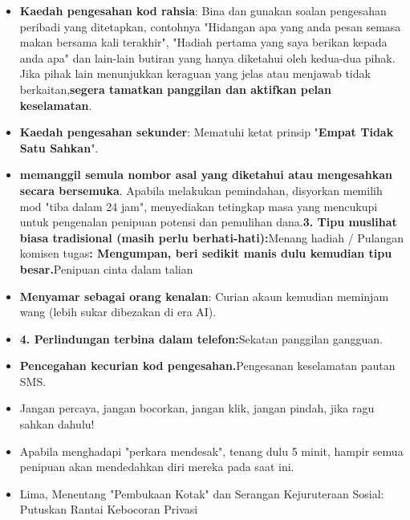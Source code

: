 \begin{itemize}
  \item \textbf{Kaedah pengesahan kod rahsia}: Bina dan gunakan soalan pengesahan peribadi yang ditetapkan, contohnya "Hidangan apa yang anda pesan semasa makan bersama kali terakhir", "Hadiah pertama yang saya berikan kepada anda apa" dan lain-lain butiran yang hanya diketahui oleh kedua-dua pihak. Jika pihak lain menunjukkan keraguan yang jelas atau menjawab tidak berkaitan,\textbf{segera tamatkan panggilan dan aktifkan pelan keselamatan}.
  \item \textbf{Kaedah pengesahan sekunder}: Mematuhi ketat prinsip "\textbf{Empat Tidak Satu Sahkan}".
  \item \textbf{memanggil semula nombor asal yang diketahui atau mengesahkan secara bersemuka}. Apabila melakukan pemindahan, disyorkan memilih mod "tiba dalam 24 jam", menyediakan tetingkap masa yang mencukupi untuk pengenalan penipuan potensi dan pemulihan dana.\textbf{3. Tipu muslihat biasa tradisional (masih perlu berhati-hati):}Menang hadiah / Pulangan komisen tugas\textbf{: Mengumpan, beri sedikit manis dulu kemudian tipu besar.}Penipuan cinta dalam talian
\end{itemize}


\begin{itemize}
  \item \textbf{Menyamar sebagai orang kenalan}: Curian akaun kemudian meminjam wang (lebih sukar dibezakan di era AI).
  \item \textbf{4. Perlindungan terbina dalam telefon:}Sekatan panggilan gangguan.
  \item \textbf{Pencegahan kecurian kod pengesahan.}Pengesanan keselamatan pautan SMS.
\end{itemize}


\begin{itemize}
  \item Jangan percaya, jangan bocorkan, jangan klik, jangan pindah, jika ragu sahkan dahulu!
  \item Apabila menghadapi "perkara mendesak", tenang dulu 5 minit, hampir semua penipuan akan mendedahkan diri mereka pada saat ini.
  \item Lima, Menentang "Pembukaan Kotak" dan Serangan Kejuruteraan Sosial: Putuskan Rantai Kebocoran Privasi
\end{itemize}


